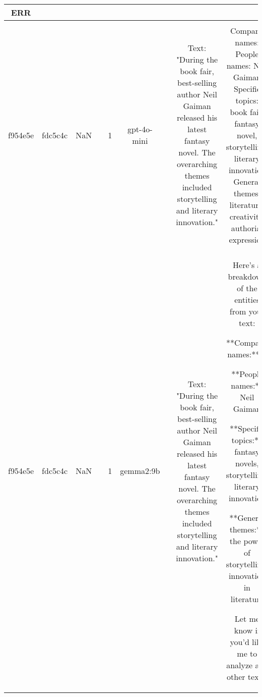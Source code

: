 \begin{table}[h!]
\begin{tabular}{|c|c|c|c|c|c|c|c|c|c|c|}
ERR\\
\hline
f954e5e & fdc5c4c & NaN &  & 1 & gpt-4o-mini &  & Text: "During the book fair, best-selling author Neil Gaiman released his latest fantasy novel. The overarching themes included storytelling and literary innovation." & Company names: 
People names: Neil Gaiman
Specific topics: book fair, fantasy novel, storytelling, literary innovation
General themes: literature, creativity, authorial expression & err & The chatbot output does not comply with the desired format stated in the description. The format requires that each category ("Company names", "People names", "Specific topics", "General themes") should have a comma-separated list if applicable, and should follow with a "-||-" if not applicable. In this output:

1. "Company names" is left blank and does not use the "-||-" as specified in the format.
2. "People names", "Specific topics", and "General themes" comply with the format since the format error only applies to the "Company names" section.

Based on these observations, there is a violation of the required format for "Company names".

ERR\\
\hline
f954e5e & fdc5c4c & NaN &  & 1 & gemma2:9b &  & Text: "During the book fair, best-selling author Neil Gaiman released his latest fantasy novel. The overarching themes included storytelling and literary innovation." & Here's a breakdown of the entities from your text:

**Company names:**  || 

**People names:** Neil Gaiman 

**Specific topics:** fantasy novels, storytelling, literary innovation

**General themes:**  the power of storytelling,  innovation in literature


Let me know if you'd like me to analyze any other texts! 
 & err & In evaluating the compliance of the chatbot output with the description, I've noticed that the description specifies a desired format for output which includes a comma-separated list for each category: Company names, People names, Specific topics, and General themes. It uses the format: 
Company names: <comma_separated_list_of_company_names>
People names: -||-
Specific topics: -||-
General themes: -||-

1. **Company names**: It should be preceded by a colon followed by a comma-separated list. The output shows "||", which is not part of the described output format. This is considered a violation.
   

\end{tabular}
\end{table}
